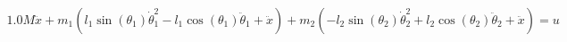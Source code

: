 \documentclass[preview]{standalone}
\begin{document}
\begin{align*}
1.0 M \ddot{x} + m_{1} \left(l_{1} \operatorname{sin}\left(\theta_{1}\right) \dot{\theta}_{1}^{2} - l_{1} \operatorname{cos}\left(\theta_{1}\right) \ddot{\theta}_{1} + \ddot{x}\right) + m_{2} \left(- l_{2} \operatorname{sin}\left(\theta_{2}\right) \dot{\theta}_{2}^{2} + l_{2} \operatorname{cos}\left(\theta_{2}\right) \ddot{\theta}_{2} + \ddot{x}\right) = u
\end{align*}
\end{document}
